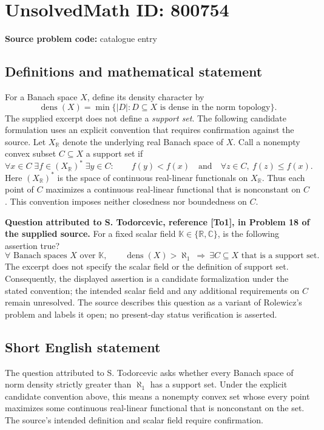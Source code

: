 \documentclass[11pt]{article}
\newcommand{\R}{\mathbb{R}}
\newcommand{\C}{\mathbb{C}}
\begin{document}
\section*{UnsolvedMath ID: 800754}
\textbf{Source problem code:} catalogue entry
\subsection{Definitions and mathematical statement}
For a Banach space \(X\), define its density character by
\[
\operatorname{dens}(X)=\min\{\lvert D\rvert:D\subseteq X\text{ is dense in the norm topology}\}.
\]
The supplied excerpt does not define a \emph{support set}. The following candidate formulation uses an explicit convention that requires confirmation against the source. Let \(X_{\R}\) denote the underlying real Banach space of \(X\). Call a nonempty convex subset \(C\subseteq X\) a support set if
\[
\forall x\in C\;\exists f\in(X_{\R})^*\;\exists y\in C:
\qquad f(y)<f(x)\quad\text{and}\quad
\forall z\in C,\ f(z)\leq f(x).
\]
Here \((X_{\R})^*\) is the space of continuous real-linear functionals on \(X_{\R}\). Thus each point of \(C\) maximizes a continuous real-linear functional that is nonconstant on \(C\). This convention imposes neither closedness nor boundedness on \(C\).

\textbf{Question attributed to S. Todorcevic, reference [To1], in Problem 18 of the supplied source.} For a fixed scalar field \(\mathbb K\in\{\R,\C\}\), is the following assertion true?
\[
\forall\text{ Banach spaces }X\text{ over }\mathbb K,\qquad
\operatorname{dens}(X)>\aleph_1
\ \Longrightarrow\
\exists C\subseteq X\text{ that is a support set}.
\]
The excerpt does not specify the scalar field or the definition of support set. Consequently, the displayed assertion is a candidate formalization under the stated convention; the intended scalar field and any additional requirements on \(C\) remain unresolved. The source describes this question as a variant of Rolewicz's problem and labels it open; no present-day status verification is asserted.
\subsection{Short English statement}
The question attributed to S. Todorcevic asks whether every Banach space of norm density strictly greater than \(\aleph_1\) has a support set. Under the explicit candidate convention above, this means a nonempty convex set whose every point maximizes some continuous real-linear functional that is nonconstant on the set. The source's intended definition and scalar field require confirmation.
\end{document}
